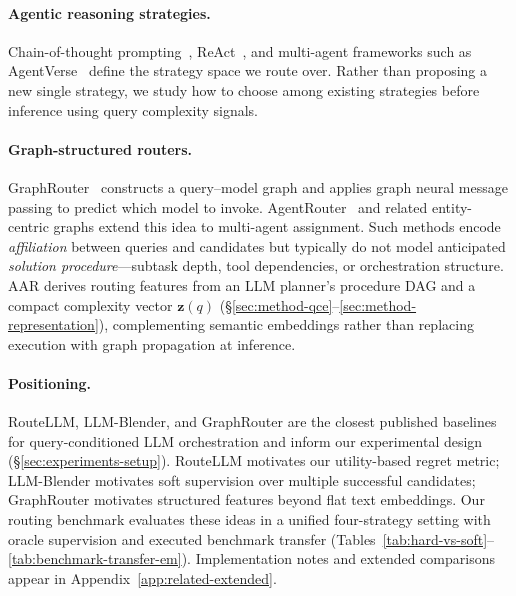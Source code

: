 \paragraph{Agentic reasoning strategies.}
Chain-of-thought prompting~\citep{wei2022cot}, ReAct~\citep{yao2023react}, and multi-agent frameworks such as AgentVerse~\citep{chen2024agentverse} define the strategy space we route over.
Rather than proposing a new single strategy, we study how to choose among existing strategies before inference using query complexity signals.

\paragraph{Graph-structured routers.}
GraphRouter~\citep{feng2025graphrouter} constructs a query--model graph and applies graph
neural message passing to predict which model to invoke.
AgentRouter~\citep{zhang2025agentrouter} and related entity-centric graphs extend this idea to multi-agent assignment.
Such methods encode \emph{affiliation} between queries and candidates but typically do not
model anticipated \emph{solution procedure}---subtask depth, tool dependencies, or
orchestration structure.
AAR derives routing features from an LLM planner's procedure DAG and a compact
complexity vector $\mathbf{z}(q)$ (\S\ref{sec:method-qce}--\ref{sec:method-representation}),
complementing semantic embeddings rather than replacing execution with graph propagation at
inference.

\paragraph{Positioning.}
RouteLLM, LLM-Blender, and GraphRouter are the closest published baselines for
query-conditioned LLM orchestration and inform our experimental design
(\S\ref{sec:experiments-setup}).
RouteLLM motivates our utility-based regret metric; LLM-Blender motivates soft supervision
over multiple successful candidates; GraphRouter motivates structured features beyond flat
text embeddings.
Our routing benchmark evaluates these ideas in a unified four-strategy setting with oracle
supervision and executed benchmark transfer (Tables~\ref{tab:hard-vs-soft}--\ref{tab:benchmark-transfer-em}).
Implementation notes and extended comparisons appear in
Appendix~\ref{app:related-extended}.
